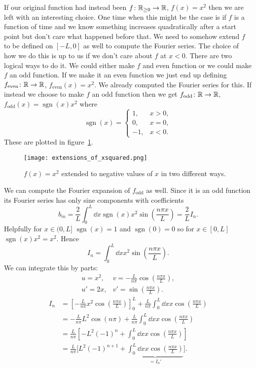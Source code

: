\documentclass[a4paper]{article}
\DeclareMathOperator{\sgn}{sgn}
\begin{document}
    If our original function had instead been \(f\colon\mathbb{R}_{\ge 0}\to\mathbb{R}\), \(f(x) = x^2\) then we are left with an interesting choice.
    One time when this might be the case is if \(f\) is a function of time and we know something increases quadratically after a start point but don't care what happened before that.
    We need to somehow extend \(f\) to be defined on \([-L, 0]\) as well to compute the Fourier series.
    The choice of how we do this is up to us if we don't care about \(f\) at \(x < 0\).
    There are two logical ways to do it.
    We could either make \(f\) and even function or we could make \(f\) an odd function.
    If we make it an even function we just end up defining \(f_\text{even}\colon\mathbb{R}\to\mathbb{R}\), \(f_\text{even}(x) = x^2\).
    We already computed the Fourier series for this.
    If instead we choose to make \(f\) an odd function then we get \(f_\text{odd}\colon\mathbb{R}\to\mathbb{R}\), \(f_\text{odd}(x) = \sgn(x)x^2\) where
    \[
        \sgn(x) = 
        \begin{cases}
            1, & x > 0,\\
            0, & x = 0,\\
            -1, & x < 0.
        \end{cases}
    \]
    These are plotted in figure~\ref{fig:extension of x^2 defined on x>0}.
    \begin{figure}[ht]
        \centering
        \texttt{[image: extensions\_of\_xsquared.png]}
        \caption{\(f(x) = x^2\) extended to negative values of \(x\) in two different ways.}
        \label{fig:extension of x^2 defined on x>0}
    \end{figure}
    We can compute the Fourier expansion of \(f_\text{odd}\) as well.
    Since it is an odd function its Fourier series has only sine components with coefficients
    \[b_m = \frac{2}{L}\int_0^L \dd{x} \sgn(x)x^2\sin\left(\frac{n\pi x}{L}\right) = \frac{2}{L}I_n.\]
    Helpfully for \(x\in(0, L]\) \(\sgn(x) = 1\) and \(\sgn(0) = 0\) so for \(x\in[0, L]\) \(\sgn(x)x^2 = x^2\).
    Hence
    \[I_n = \int_0^L \dd{x} x^2 \sin\left(\frac{n\pi x}{L}\right).\]
    We can integrate this by parts:
    \[
        \begin{array}{ll}
            u = x^2, & v = -\frac{L}{n\pi}\cos\left(\frac{n\pi x}{L}\right),\\[0.5em]
            u' = 2x, & v' = \sin\left(\frac{n\pi x}{L}\right).
        \end{array}
    \]
    \begin{align*}
        I_n &= \left[-\frac{L}{n\pi}x^2\cos\left(\frac{n\pi x}{L}\right)\right]_0^L + \frac{L}{n\pi} \int_0^L \dd{x} x\cos\left(\frac{n\pi x}{L}\right)\\
        &= -\frac{L}{n\pi}L^2\cos(n\pi) + \frac{L}{n\pi} \int_0^L \dd{x} x\cos\left(\frac{n\pi x}{L}\right)\\
        &= \frac{L}{n\pi}\left[-L^2(-1)^n + \int_0^L \dd{x} x\cos\left(\frac{n\pi x}{L}\right)\right]\\
        &= \frac{L}{n\pi}\Bigg[L^2(-1)^{n+1} + \underbrace{\int_0^L \dd{x} x\cos\left(\frac{n\pi x}{L}\right)}_{=I_n'}\Bigg].
    \end{align*}
\end{document}

